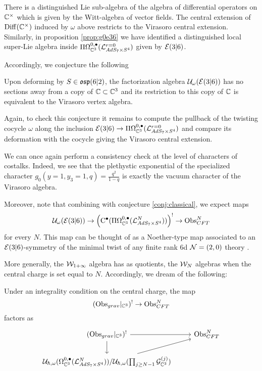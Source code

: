 \parsec[]
There is a distinguished Lie sub-algebra of the algebra of differential operators on $\mathbb{C}^\times$ which is given by the Witt-algebra of vector fields. The central extension of $\operatorname{Diff} (\mathbb{C}^\times)$ induced by $\omega$ above restricts to the Virasoro central extension. Similarly, in proposition \ref{prop:g0e36} we have identified a distinguished local super-Lie algebra inside $\Pi\Omega^{0,\bullet} _{\mathbb{C}^3}(\mathcal{L}^{r=0} _{AdS_7\times S^4} )$ given by $\mathcal{E}(3|6)$.

Accordingly, we conjecture the following
\begin{conj}
Upon deforming by $S\in \mathfrak{osp}(6|2)$, the factorization algebra $\mathcal{U}_\omega( \mathcal{E}(3|6) )$ has no sections away from a copy of $\mathbb{C}\subset \mathbb{C}^3$ and its restriction to this copy of $\mathbb{C}$ is equivalent to the Virasoro vertex algebra.
\end{conj}

Again, to check this conjecture it remains to compute the pullback of the twisting cocycle $\omega$ along the inclusion $\mathcal{E}(3|6)\to \Pi\Omega^{0,\bullet}_{\mathbb{C}^3} (\mathcal{L}^{r=0}_{AdS_7\times S^4} )$ and compare its deformation with the cocycle giving the Virasoro central extension.

We can once again perform a consistency check at the level of characters of costalks. Indeed, we see that the plethystic exponential of the specialized character $g_0(y=1, y_3=1, q) = \frac{q^2}{1-q}$ is exactly the vacuum character of the Virasoro algebra. 

Moreover, note that combining with conjecture \ref{conj:classical}, we expect maps 
\[\mathcal{U}_\omega( \mathcal{E}(3|6) )\to \left ({\mathrm{C}}^\bullet (\Pi\Omega^{0,\bullet}_{\mathbb{C}^3} (\mathcal{L}^N_{AdS_7\times S^4}))\right)^! \to \text{Obs}^N_{CFT}\] for every $N$. This map can be thought of as a Noether-type map associated to an  $\mathcal{E}(3|6)$-symmetry of the minimal twist of any finite rank 6d $\mathcal{N}=(2,0)$ theory \cite{CG2}.

\parsec[]
More generally, the $\mathcal{W}_{1+\infty}$ algebra has as quotients, the $\mathcal{W}_N$ algebras when the central charge is set equal to $N$. Accordingly, we dream of the following:

\begin{spec}
Under an integrality condition on the central charge, the map \[ (\text{Obs}_{grav} |_{\mathbb{C}^3} )^! \to \text{Obs}^N_{CFT}\] factors as
\[
\begin{tikzcd}
(\Obs_{grav} |_{\C^3} )^! \ar[r]\ar[d]  & \Obs^N_{CFT} \\
\mc U_{\hbar, \omega} (\Omega^{0,\bullet}_{\C^3} (\mc L^N_{AdS_7\times S^4}))/\mc U_{\hbar, \omega} (\prod _{j\geq {N-1}} \mc G^{(j)}_{\C^3} ) \ar[ur]
\end{tikzcd}
\]
\end{spec}


